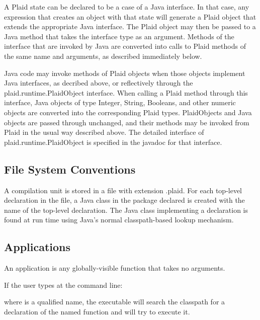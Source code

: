   A Plaid state can be declared to
be a case of a Java interface.  In that case, any 
expression that creates an object with that state will generate a
Plaid object that extends the appropriate Java interface.  The Plaid
object may then be passed to a Java method that takes the interface
type as an argument.  Methods of the interface that are invoked by
Java are converted into calls to Plaid methods of the same name and
arguments, as described immediately below.

  Java code may invoke methods of
Plaid objects when those objects implement Java interfaces, as
decribed above, or reflectively through the plaid.runtime.PlaidObject
interface.  When calling a Plaid method through this interface, Java
objects of type Integer, String, Booleans, and other numeric objects
are converted into the corresponding Plaid types.  PlaidObjects and
Java objects are passed through unchanged, and their methods may be
invoked from Plaid in the usual way described above.  The detailed
interface of plaid.runtime.PlaidObject is specified in the javadoc
for that interface.


\subsection{File System Conventions}

A compilation unit is stored in a file with extension .plaid.  For each
top-level declaration in the file, a Java class in the package declared
is created with the name of the top-level declaration.  The Java class
implementing a declaration is found at run time using Java's normal
classpath-based lookup mechanism.


\subsection{Applications}

An application is any globally-visible function that takes no arguments.

\noindent
If the user types at the command line:

\begin{quote}
\end{quote}

\noindent
where  is a qualified name, the 
executable will search the classpath for a declaration of the named
function and will try to execute it.

